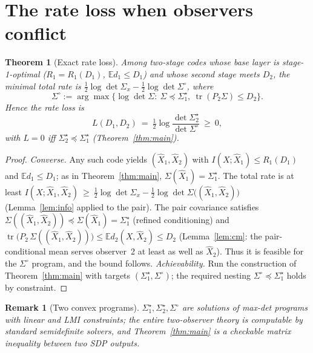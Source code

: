 \documentclass[11pt]{article}
\newtheorem{theorem}{Theorem}\newtheorem{lemma}{Lemma}
\newtheorem{remark}{Remark}\newtheorem{example}{Example}
\newcommand{\E}{\mathbb{E}}\newcommand{\tr}{\operatorname{tr}}
\begin{document}
\section{The rate loss when observers conflict}
\begin{theorem}[Exact rate loss]\label{thm:loss}
Among two-stage codes whose base layer is stage-1-optimal
($R_1=R_1(D_1)$, $\E d_1\le D_1$) and whose second stage meets $D_2$, the
minimal total rate is
$\tfrac12\log\det\Sigma_x-\tfrac12\log\det\Sigma^\circ$, where
\[
\Sigma^\circ:=\arg\max\{\log\det\Sigma:\ \Sigma\preceq\Sigma_1^\star,\
\tr(P_2\Sigma)\le D_2\}.
\]
Hence the rate loss is
\[
L(D_1,D_2)\ =\ \tfrac12\log\frac{\det\Sigma_2^\star}{\det\Sigma^\circ}\ \ge\ 0,
\]
with $L=0$ iff $\Sigma_2^\star\preceq\Sigma_1^\star$ (Theorem~\ref{thm:main}).
\end{theorem}
\begin{proof}
\emph{Converse.} Any such code yields $(\hat X_1,\hat X_2)$ with
$I(X;\hat X_1)\le R_1(D_1)$ and $\E d_1\le D_1$; as in
Theorem~\ref{thm:main}, $\Sigma(\hat X_1)=\Sigma_1^\star$. The total rate is
at least $I(X;\hat X_1,\hat X_2)\ \ge\
\tfrac12\log\det\Sigma_x-\tfrac12\log\det\Sigma\bigl((\hat X_1,\hat X_2)\bigr)$
(Lemma~\ref{lem:info} applied to the pair). The pair covariance satisfies
$\Sigma((\hat X_1,\hat X_2))\preceq\Sigma(\hat X_1)=\Sigma_1^\star$
(refined conditioning) and
$\tr\!\bigl(P_2\,\Sigma((\hat X_1,\hat X_2))\bigr)\le\E d_2(X,\hat X_2)\le
D_2$ (Lemma~\ref{lem:cm}: the pair-conditional mean serves observer~2 at
least as well as $\hat X_2$). Thus it is feasible for the $\Sigma^\circ$
program, and the bound follows.
\emph{Achievability.} Run the construction of Theorem~\ref{thm:main} with
targets $(\Sigma_1^\star,\Sigma^\circ)$; the required nesting
$\Sigma^\circ\preceq\Sigma_1^\star$ holds by constraint.
\end{proof}

\begin{remark}[Two convex programs]
$\Sigma_1^\star,\Sigma_2^\star,\Sigma^\circ$ are solutions of max-det
programs with linear and LMI constraints; the entire two-observer theory is
computable by standard semidefinite solvers, and Theorem~\ref{thm:main} is a
checkable matrix inequality between two SDP outputs.
\end{remark}
\end{document}
